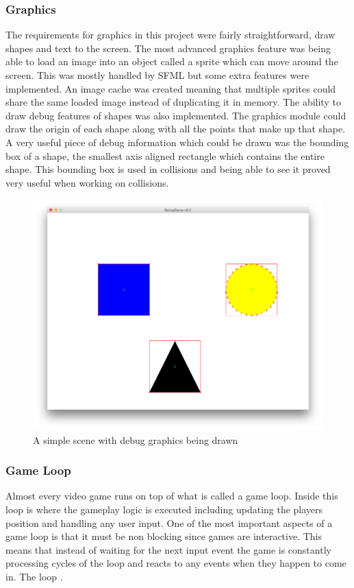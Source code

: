 \documentclass[]{report}
\begin{document}
			\subsubsection{Graphics}
			The requirements for graphics in this project were fairly straightforward, draw shapes and text to the screen. The most advanced graphics feature was being able to load an image into an object called a sprite which can move around the screen. This was mostly handled by SFML but some extra features were implemented. An image cache was created meaning that multiple sprites could share the same loaded image instead of duplicating it in memory. The ability to draw debug features of shapes was also implemented. The graphics module could draw the origin of each shape along with all the points that make up that shape. A very useful piece of debug information which could be drawn was the bounding box of a shape, the smallest axis aligned rectangle which contains the entire shape. This bounding box is used in collisions and being able to see it proved very useful when working on collisions.
			\begin{figure}[H]
				\centering
				\includegraphics[scale=0.25]{debuggraphics}
				\caption{A simple scene with debug graphics being drawn}
				\label{debuggraphics}
			\end{figure}
			
			\subsubsection{Game Loop}
			Almost every video game runs on top of what is called a game loop. Inside this loop is where the gameplay logic is executed including updating the players position and handling any user input. One of the most important aspects of a game loop is that it must be non blocking since games are interactive. This means that instead of waiting for the next input event the game is constantly processing cycles of the loop and reacts to any events when they happen to come in. The loop  \cite{gamepatterns}.
			
\end{document}
